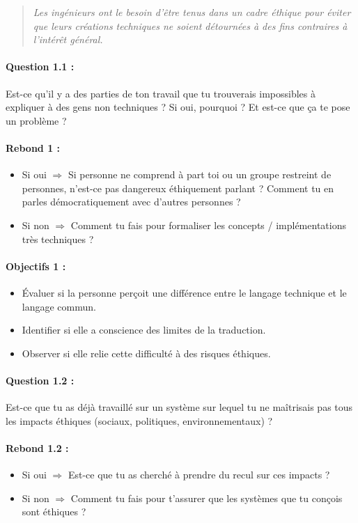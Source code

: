 \documentclass[12pt,a4paper]{report}
\begin{document}
\begin{quote}
\textit{Les ingénieurs ont le besoin d'être tenus dans un cadre éthique pour éviter que leurs créations techniques ne soient détournées à des fins contraires à l'intérêt général.}
\end{quote}

\paragraph{Question 1.1 :}
Est-ce qu'il y a des parties de ton travail que tu trouverais impossibles à expliquer à des gens non techniques ? Si oui, pourquoi ? Et est-ce que ça te pose un problème ?

\paragraph{Rebond 1 :}
\begin{itemize}
    \item Si oui $\Rightarrow$ Si personne ne comprend à part toi ou un groupe restreint de personnes, n'est-ce pas dangereux éthiquement parlant ? Comment tu en parles démocratiquement avec d'autres personnes ?
    \item Si non $\Rightarrow$ Comment tu fais pour formaliser les concepts / implémentations très techniques ?
\end{itemize}

\paragraph{Objectifs 1 :}
\begin{itemize}
    \item Évaluer si la personne perçoit une différence entre le langage technique et le langage commun.
    \item Identifier si elle a conscience des limites de la traduction.
    \item Observer si elle relie cette difficulté à des risques éthiques.
\end{itemize}

\paragraph{Question 1.2 :}
Est-ce que tu as déjà travaillé sur un système sur lequel tu ne maîtrisais pas tous les impacts éthiques (sociaux, politiques, environnementaux) ?

\paragraph{Rebond 1.2 :}
\begin{itemize}
    \item Si oui $\Rightarrow$ Est-ce que tu as cherché à prendre du recul sur ces impacts ?
    \item Si non $\Rightarrow$ Comment tu fais pour t'assurer que les systèmes que tu conçois sont éthiques ?
\end{itemize}
\end{document}
